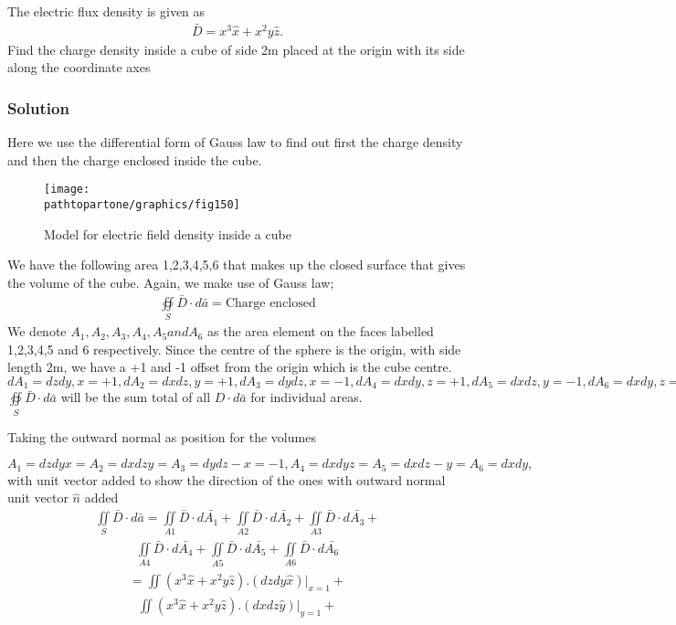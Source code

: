 \begin{exmp}
The electric flux density is given as
\begin{align*}
\bar{D}=x^{3}\hat{x} + x^{2}y\hat{z}.
\end{align*}
Find the charge density inside a cube of side 2m placed at the origin with its side along the coordinate axes

\subsubsection*{Solution}

Here we use the differential form of Gauss law to find out first the charge density and then the charge enclosed inside the cube.\\
\begin{figure}[h]
\centering
\texttt{[image: \\pathtopartone/graphics/fig150]}
\caption{Model for electric field density inside a cube}
\end{figure}

We have the following area 1,2,3,4,5,6 that makes up the closed surface that gives the volume of the cube. Again, we make use of Gauss law;
\begin{align*}
\oiint\limits_S\bar{D}\cdot d\bar{a} = \text{Charge enclosed}
\end{align*}
We denote $A_1,A_2,A_3,A_4,A_5 and A_6$ as the area element on the faces labelled 1,2,3,4,5 and 6 respectively. Since the centre of the sphere is the origin, with side length 2m, we have a +1 and -1 offset from the origin which is the cube centre.\\

$dA_1 = dzdy, x= +1, dA_2 = dxdz, y= +1, dA_3 = dydz, x= -1, dA_4 = dxdy, z= +1, dA_5 = dxdz, y= -1, dA_6 = dxdy, z= -1 $\\

$\oiint\limits_S\bar{D}\cdot d\bar{a}$ will be the sum total of all ${D}\cdot d\bar{a}$ for individual areas.

Taking the outward normal as position for the volumes

$A_1 = dzdyx=  A_2 = dxdzy= A_3 = dydz-x= -1, A_4 = dxdyz= A_5 = dxdz-y= A_6 = dxdy, $\\ with unit vector added to show the direction of the ones with outward normal unit vector $\hat{n}$ added
\begin{align*}
\iint\limits_S\bar{D}\cdot d\bar{a} = \iint\limits_{A1}\bar{D}\cdot d\bar{A_1} +\iint\limits_{A2}\bar{D}\cdot d\bar{A_2}+ \iint\limits_{A3}\bar{D}\cdot d\bar{A_3}+ 
\end{align*}
\begin{align*}
\iint\limits_{A4}\bar{D}\cdot d\bar{A_4}+ \iint\limits_{A5}\bar{D}\cdot d\bar{A_5}+ \iint\limits_{A6}\bar{D}\cdot d\bar{A_6}   
\end{align*}
\begin{align*}
=\iint\limits(x^3 \hat{x}+ x^2y\hat{z}).(dzdy\hat{x})|_{x=1}+
\end{align*}
\begin{align*}
\iint\limits(x^3 \hat{x}+ x^2y\hat{z}).(dxdz\hat{y})|_{y=1}+
\end{align*}


\end{exmp}
